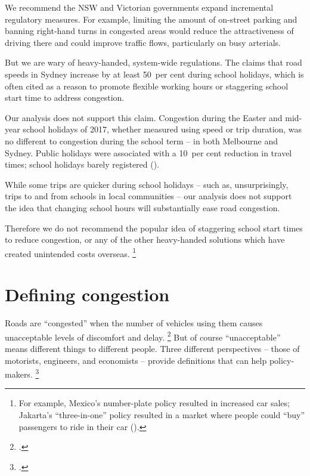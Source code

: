 \documentclass{grattan}
\begin{document}
We recommend the NSW and Victorian governments expand incremental regulatory measures.
For example, limiting the amount of on-street parking and banning right-hand turns in congested areas would reduce the attractiveness of driving there and could improve traffic flows, particularly on busy arterials.

But we are wary of heavy-handed, system-wide regulations. The \textcite{NRMA-SchoolHolidays-2013} claims that road speeds in Sydney increase by at least 50~per cent during school holidays, which is often cited as a reason to promote flexible working hours or staggering school start time to address congestion.



Our analysis does not support this claim.
Congestion during the Easter and mid-year school holidays of 2017, whether measured using speed or trip duration, was no different to congestion during the school term -- in both Melbourne and Sydney.
Public holidays were associated with a 10~per cent reduction in travel times; school holidays barely registered ().

While some trips are quicker during school holidays -- such as, unsurprisingly, trips to and from schools in local communities -- our analysis does not support the idea that changing school hours will substantially ease road congestion.

Therefore we do not recommend the popular idea of staggering school start times to reduce congestion, or any of the other heavy-handed solutions which have created unintended costs overseas.%
    \footnote{For example, Mexico’s number-plate policy resulted in increased car sales; Jakarta's “three-in-one” policy resulted in a market where people could ``buy'' passengers to ride in their car (\textcite{congestion-Mexico-cityl}).}


















\appendix
\chapter{Defining congestion}\label{chap:appendix-defining-congestion}

Roads are “congested” when the number of vehicles using them causes unacceptable levels of discomfort and delay.%
    \footcite[][93]{Falcocchio-and-Levinson-congestion-a-concise-guide}
But of course “unacceptable” means different things to different people. Three different perspectives – those of motorists, engineers, and economists -- provide definitions that can help policy-makers.%
    \footcite[][7]{Wallis-Lupton-2013-NZ-Transport-Agency}
\end{document}
